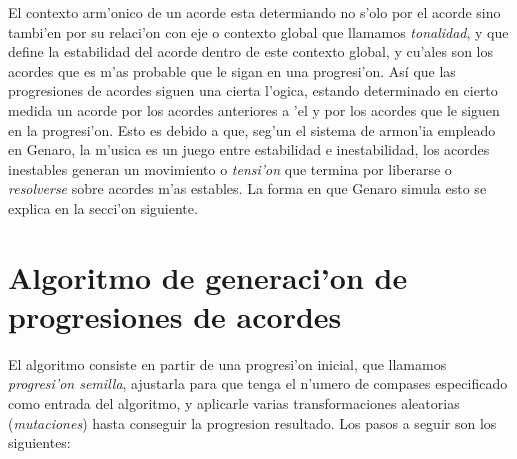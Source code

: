 \documentclass[a4paper,12pt]{article}
\begin{document}
El contexto arm'onico de un acorde esta determiando no s'olo por el acorde sino tambi'en por su relaci'on con eje o contexto global que llamamos \emph{tonalidad}, y que define la estabilidad del acorde dentro de este contexto global, y cu'ales son los acordes que es m'as probable que le sigan en una progresi'on. Así que las progresiones de acordes siguen una cierta l'ogica, estando determinado en cierto medida un acorde por los acordes anteriores a 'el y por los acordes que le siguen en la progresi'on. Esto es debido a que, seg'un el sistema de armon'ia empleado en Genaro, la m'usica es un juego entre estabilidad e inestabilidad, los acordes inestables generan un movimiento o \emph{tensi'on} que termina por liberarse o \emph{resolverse} sobre acordes m'as estables. La forma en que Genaro simula esto se explica en la secci'on siguiente.

\section {Algoritmo de generaci'on de progresiones de acordes}
El algoritmo consiste en partir de una progresi'on inicial, que llamamos \emph{progresi'on semilla}, ajustarla para que tenga el n'umero de compases especificado como entrada del algoritmo, y aplicarle varias transformaciones aleatorias (\emph{mutaciones}) hasta conseguir la progresion resultado. Los pasos a seguir son los siguientes:
\end{document}
